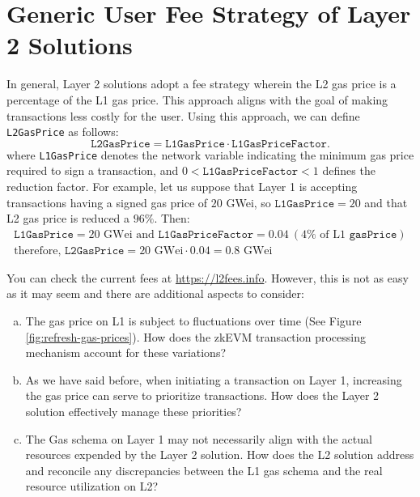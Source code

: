 \section{Generic User Fee Strategy of Layer 2 Solutions}

In general, Layer 2 solutions adopt a fee strategy wherein the L2 gas price is a percentage of the L1 gas price. This approach aligns with the goal of making transactions less costly for the user. Using this approach, we can define \texttt{L2GasPrice} as follows:
\[
\texttt{L2GasPrice} = \texttt{L1GasPrice} \cdot \texttt{L1GasPriceFactor}.
\]
where \texttt{L1GasPrice} denotes the network variable indicating the minimum gas price required to sign a transaction, and $0 < \texttt{L1GasPriceFactor} < 1$ defines the reduction factor. For example, let us suppose that Layer 1 is accepting transactions having a signed gas price of $20$ GWei, so $\texttt{L1GasPrice} = 20$ and that L2 gas price is reduced a $96\%$. Then:
\begin{gather*}
\texttt{L1GasPrice} = 20 \text{ GWei} \text{ and } \texttt{L1GasPriceFactor} = 0.04 \ (4\% \text{ of L1 } \texttt{gasPrice}) \\
\text{therefore, } \texttt{L2GasPrice} = 20 \text{ GWei} \cdot 0.04 =  0.8 \text{ GWei}
\end{gather*}

You can check the current fees at \url{https://l2fees.info}. However, this is not as easy as it may seem and there are additional aspects to consider:

\begin{enumerate}[a)]
\item The gas price on L1 is subject to fluctuations over time (See Figure \ref{fig:refresh-gas-prices}). How does the zkEVM transaction processing mechanism account for these variations?

\item As we have said before, when initiating a transaction on Layer 1, increasing the gas price can serve to prioritize transactions. How does the Layer 2 solution effectively manage these priorities?

\item The Gas schema on Layer 1 may not necessarily align with the actual resources expended by the Layer 2 solution. How does the L2 solution address and reconcile any discrepancies between the L1 gas schema and the real resource utilization on L2?

\end{enumerate}

